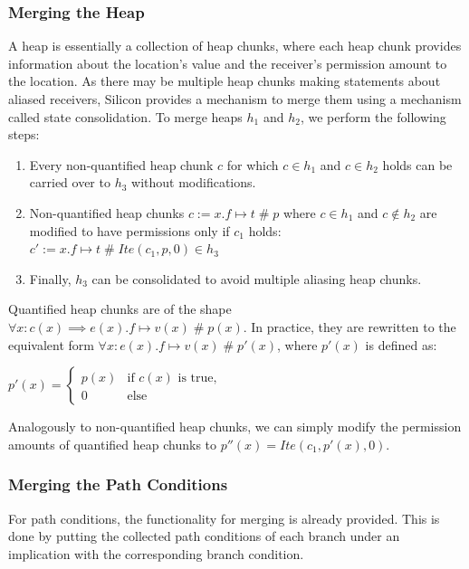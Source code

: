 \documentclass[11pt]{article}
\DeclareMathOperator{\perm}{\mathbin{\#}}
\begin{document}
    \subsubsection{Merging the Heap}

    A heap is essentially a collection of heap chunks, where each heap chunk provides information
    about the location's value and the receiver's permission amount to the location.
    As there may be multiple heap chunks making statements about aliased receivers,
    Silicon provides a mechanism to merge them using a mechanism called state consolidation.
    To merge heaps $h_1$ and $h_2$, we perform the following steps:

    \begin{enumerate}
        \item Every non-quantified heap chunk $c$ for which $c \in h_1$ and $c \in h_2$ holds can be carried over to $h_3$
            without modifications.
        \item Non-quantified heap chunks $c := x.f \mapsto t \perm p$ where $c \in h_1$ and $c \notin h_2$ are modified to
            have permissions only if $c_1$ holds: $c' := x.f \mapsto t \perm Ite(c_1, p, 0) \in h_3$
        \item Finally, $h_3$ can be consolidated to avoid multiple aliasing heap chunks.
    \end{enumerate}

    Quantified heap chunks are of the shape $\forall x: c(x) \implies e(x).f \mapsto v(x) \perm p(x)$.
    In practice, they are rewritten to the equivalent form $\forall x: e(x).f \mapsto v(x) \perm p'(x)$,
    where $p'(x)$ is defined as:

    \begin{math}
        p'(x) = \begin{cases}
            p(x) & \text{if } c(x) \text{ is true,} \\
            0 & \text{else}
        \end{cases}
    \end{math}

    Analogously to non-quantified heap chunks, we can simply modify the permission amounts of
    quantified heap chunks to $p''(x) = Ite(c_1, p'(x), 0)$.

    \subsubsection{Merging the Path Conditions}

    For path conditions, the functionality for merging is already provided.
    This is done by putting the collected path conditions of each branch
    under an implication with the corresponding branch condition.
\end{document}
